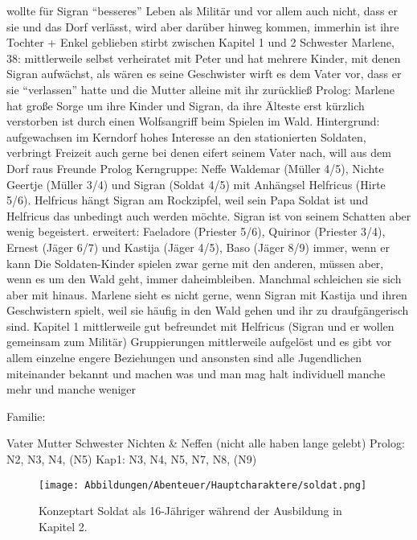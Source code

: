 \begin{outline}
			\3 wollte für Sigran "`besseres"' Leben als Militär und vor allem auch nicht, dass er sie und das Dorf verlässt, wird aber darüber hinweg kommen, immerhin ist ihre Tochter + Enkel geblieben
			\3 stirbt zwischen Kapitel 1 und 2
		\2 Schwester Marlene, 38: 
			\3 mittlerweile selbst verheiratet mit Peter und hat mehrere Kinder, mit denen Sigran aufwächst, als wären es seine Geschwister
			\3 wirft es dem Vater vor, dass er sie "`verlassen"' hatte und die Mutter alleine mit ihr zurückließ
			\3 Prolog: Marlene hat große Sorge um ihre Kinder und Sigran, da ihre Älteste erst kürzlich verstorben ist durch einen Wolfsangriff beim Spielen im Wald.
	\1 Hintergrund:
		\2 aufgewachsen im Kerndorf
		\2 hohes Interesse an den stationierten Soldaten, verbringt Freizeit auch gerne bei denen
		\2 eifert seinem Vater nach, will aus dem Dorf raus
	\1 Freunde 
		\2 Prolog
			\3 Kerngruppe: Neffe Waldemar (Müller 4/5), Nichte Geertje (Müller 3/4) und Sigran (Soldat 4/5) mit Anhängsel Helfricus (Hirte 5/6). Helfricus hängt Sigran am Rockzipfel, weil sein Papa Soldat ist und Helfricus das unbedingt auch werden möchte. Sigran ist von seinem Schatten aber wenig begeistert.
			\3 erweitert: Faeladore (Priester 5/6), Quirinor (Priester 3/4), Ernest (Jäger 6/7) und Kastija (Jäger 4/5), Baso (Jäger 8/9) immer, wenn er kann
			\3 Die Soldaten-Kinder spielen zwar gerne mit den anderen, müssen aber, wenn es um den Wald geht, immer daheimbleiben. Manchmal schleichen sie sich aber mit hinaus. Marlene sieht es nicht gerne, wenn Sigran mit Kastija und ihren Geschwistern spielt, weil sie häufig in den Wald gehen und ihr zu draufgängerisch sind.
		\2 Kapitel 1
			\3 mittlerweile gut befreundet mit Helfricus (Sigran und er wollen gemeinsam zum Militär)
			\3 Gruppierungen mittlerweile aufgelöst und es gibt vor allem einzelne engere Beziehungen und ansonsten sind alle Jugendlichen miteinander bekannt und machen was und man mag halt individuell manche mehr und manche weniger		
\end{outline}

Familie:
\begin{outline}
	\1 Vater
	\1 Mutter
	 Schwester
	 Nichten \& Neffen (nicht alle haben lange gelebt)
	\3 Prolog: N2, N3, N4, (N5)
	\3 Kap1: N3, N4, N5, N7, N8, (N9)
\end{outline}


\begin{figure}[tbh]
	\centering
	\texttt{[image: Abbildungen/Abenteuer/Hauptcharaktere/soldat.png]}
	\caption[Konzeptart Soldat]{Konzeptart Soldat als 16-Jähriger während der Ausbildung in Kapitel 2.}
	\label{fig:mc-soldat}
\end{figure}




